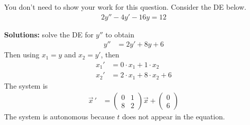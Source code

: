 \ifnum {}
\question[2] You don't need to show your work for this question. Consider the DE below.
\begin{align*}
    2y'' - 4y' - 16y = 12
\end{align*}
\ifnum {} {\color{DarkBlue} 
\textbf{Solutions:} solve the DE for $y''$ to obtain
\begin{align}
    y'' &= 2y' + 8 y + 6
\end{align}
Then using $x_1 = y$ and $x_2 = y'$, then 
\begin{align}
    x_1 ' &= 0\cdot x_1 + 1\cdot x_2 \\
    x_2' &=  2\cdot x_1 + 8\cdot x_2 + 6
\end{align}
The system is
\begin{align}
    \vec x \, ' &= \begin{pmatrix} 0&1\\8&2\end{pmatrix} \vec x + \begin{pmatrix} 0\\6\end{pmatrix}
\end{align}
The system is autonomous because $t$ does not appear in the equation. 
} 
\else 
\fi
\fi 



